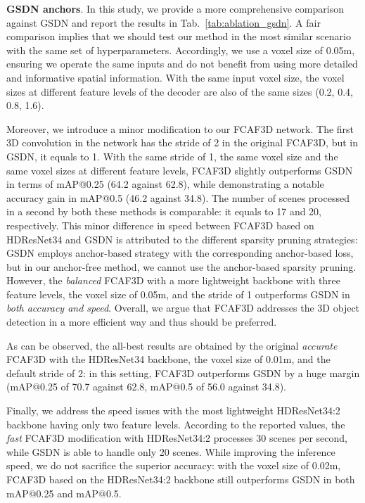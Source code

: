 \documentclass[runningheads]{llncs}
\begin{document}
\textbf{GSDN anchors}. In this study, we provide a more comprehensive comparison against GSDN and report the results in Tab.~\ref{tab:ablation_gsdn}. A fair comparison implies that we should test our method in the most similar scenario with the same set of hyperparameters. Accordingly, we use a voxel size of 0.05m, ensuring we operate the same inputs and do not benefit from using more detailed and informative spatial information. With the same input voxel size, the voxel sizes at different feature levels of the decoder are also of the same sizes (0.2, 0.4, 0.8, 1.6). 

Moreover, we introduce a minor modification to our FCAF3D network. The first 3D convolution in the network has the stride of 2 in the original FCAF3D, but in GSDN, it equals to 1. With the same stride of 1, the same voxel size and the same voxel sizes at different feature levels, FCAF3D slightly outperforms GSDN in terms of mAP@0.25 (64.2 against 62.8), while demonstrating a notable accuracy gain in mAP@0.5 (46.2 against 34.8). The number of scenes processed in a second by both these methods is comparable: it equals to 17 and 20, respectively. This minor difference in speed between FCAF3D based on HDResNet34 and GSDN is attributed to the different sparsity pruning strategies: GSDN employs anchor-based strategy with the corresponding anchor-based loss, but in our anchor-free method, we cannot use the anchor-based sparsity pruning. However, the \textit{balanced} FCAF3D with a more lightweight backbone with three feature levels, the voxel size of 0.05m, and the stride of 1 outperforms GSDN in \emph{both accuracy and speed}. Overall, we argue that FCAF3D addresses the 3D object detection in a more efficient way and thus should be preferred.

As can be observed, the all-best results are obtained by the original \textit{accurate} FCAF3D with the HDResNet34 backbone, the voxel size of 0.01m, and the default stride of 2: in this setting, FCAF3D outperforms GSDN by a huge margin (mAP@0.25 of 70.7 against 62.8, mAP@0.5 of 56.0 against 34.8).

Finally, we address the speed issues with the most lightweight HDResNet34:2 backbone having only two feature levels. According to the reported values, the \textit{fast} FCAF3D modification with HDResNet34:2 processes 30 scenes per second, while GSDN is able to handle only 20 scenes. While improving the inference speed, we do not sacrifice the superior accuracy: with the voxel size of 0.02m, FCAF3D based on the HDResNet34:2 backbone still outperforms GSDN in both mAP@0.25 and mAP@0.5.
\end{document}
